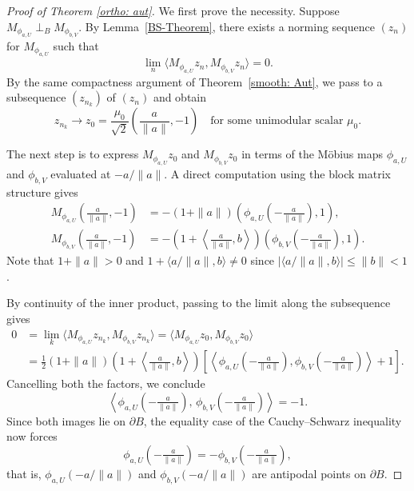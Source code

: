 \documentclass[12pt]{amsart}
\theoremstyle{definition}
\begin{document}
\begin{proof}[Proof of Theorem \ref{ortho: aut}]
We first prove the necessity. Suppose $M_{\phi_{a,U}} \perp_B M_{\phi_{b,V}}$. 
By Lemma~\ref{BS-Theorem}, there exists a norming sequence $(z_n)$ 
for $M_{\phi_{a,U}}$ such that
\[
\lim_n \langle M_{\phi_{a,U}}z_n, M_{\phi_{b,V}}z_n\rangle = 0.
\]
By the same compactness argument of Theorem~\ref{smooth: Aut}, we pass 
to a subsequence $(z_{n_k})$ of $(z_n)$  and obtain
\[
z_{n_k} \to z_0 = \frac{\mu_0}{\sqrt{2}}
\left(\frac{a}{\|a\|}, -1\right)
\quad\text{for some unimodular scalar } \mu_0.
\]

\noindent The next step is to express $M_{\phi_{a,U}}z_0$ and $M_{\phi_{b,V}}z_0$ 
in terms of the M\"{o}bius maps $\phi_{a,U}$ and $\phi_{b,V}$ 
evaluated at $-a/\|a\|$. A direct computation using the 
block matrix structure gives
\begin{align*}
M_{\phi_{a,U}}\left(\frac{a}{\|a\|}, -1\right) 
&= -(1 + \|a\|)
\left(\phi_{a,U}\!\left(-\tfrac{a}{\|a\|}\right), 1\right),\\
M_{\phi_{b,V}}\left(\frac{a}{\|a\|}, -1\right) 
&= -\left(1 + \left\langle\frac{a}{\|a\|}, b\right\rangle\right)
\left(\phi_{b,V}\!\left(-\tfrac{a}{\|a\|}\right), 1\right).
\end{align*}
Note that $1 + \|a\| > 0$ and 
$1 + \langle a/\|a\|, b\rangle \neq 0$ since 
$|\langle a/\|a\|, b\rangle| \leq \|b\| < 1$.

\medskip

\noindent By continuity of the inner product, passing to the limit 
along the subsequence gives
\begin{align*}
0 &= \lim_k\langle M_{\phi_{a,U}}z_{n_k}, M_{\phi_{b,V}}z_{n_k}\rangle 
= \langle M_{\phi_{a,U}}z_0, M_{\phi_{b,V}}z_0\rangle\\
&= \frac{1}{2}(1+\|a\|)
\left(1+\left\langle\frac{a}{\|a\|},b\right\rangle\right)
\left[\left\langle\phi_{a,U}\!\left(-\tfrac{a}{\|a\|}\right),
\phi_{b,V}\!\left(-\tfrac{a}{\|a\|}\right)\right\rangle 
+ 1\right].
\end{align*}
Cancelling both the factors, we conclude
\[
\left\langle\phi_{a,U}\!\left(-\tfrac{a}{\|a\|}\right),\, 
\phi_{b,V}\!\left(-\tfrac{a}{\|a\|}\right)\right\rangle = -1.
\]
Since both images lie on $\partial B$, the equality case of the 
Cauchy--Schwarz inequality now forces
\[
\phi_{a,U}\!\left(-\tfrac{a}{\|a\|}\right) 
= -\phi_{b,V}\!\left(-\tfrac{a}{\|a\|}\right),
\]
that is, $\phi_{a,U}\!\left(-a/\|a\|\right)$ and 
$\phi_{b,V}\!\left(-a/\|a\|\right)$ are antipodal points 
on $\partial B$.


\end{proof}
\end{document}

